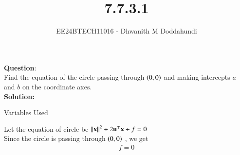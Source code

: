 \documentclass[journal]{IEEEtran}
\begin{document}

\vspace{3cm}

\title{7.7.3.1}
\author{EE24BTECH11016 - Dhwanith M Doddahundi
}
{\let\newpage\relax\maketitle}

\renewcommand{\thefigure}{\theenumi}
\renewcommand{\thetable}{\theenumi}
\setlength{\intextsep}{10pt} %


\renewcommand{\thetable}{\theenumi}


\textbf{Question}:\\
Find the equation of the circle passing through $\left(0, 0\right)$ and making intercepts $a$ and $b$
on the coordinate axes.
\\
\textbf{Solution: }
\begin{table}[h!]    
  \centering
  
  \caption{Variables Used}
  \label{tab10.5.3.9.1}
\end{table}

Let the equation of circle be $  \left\lVert\mathbf{x}\right\rVert^{2}+2\mathbf{u}^\top\mathbf{x}+f=0 $ \\
  Since the circle is passing through $\left(0,0\right)$ , we get 
\begin{align}
    f=0
\end{align}
\end{document}
